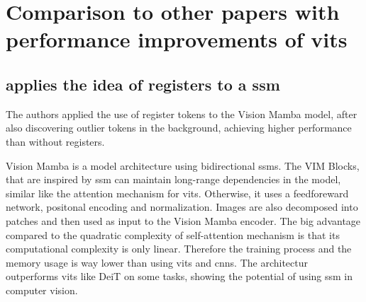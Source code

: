 \documentclass[conference]{IEEEtran}
\begin{document}


  \section{Comparison to other papers with performance improvements of \ac{vit}s}

  \subsection{\cite{mamba-needs-registers} applies the idea of registers to a \ac{ssm}}
  The authors applied the use of register tokens to the Vision Mamba model, after also discovering outlier tokens in the background, achieving higher performance than without registers. 
  
  Vision Mamba \cite{vision-mamba} is a model architecture using bidirectional \acfp{ssm}. The VIM Blocks, that are inspired by \ac{ssm} can maintain long-range dependencies in the model, similar like the attention mechanism for \acp{vit}. Otherwise, it uses a feedforeward network, positonal encoding and normalization. Images are also decomposed into patches and then used as input to the Vision Mamba encoder. The big advantage compared to the quadratic complexity of self-attention mechanism is that its computational complexity is only linear. Therefore the training process and the memory usage is way lower than using \acp{vit} and \acp{cnn}. The architectur outperforms \acp{vit} like DeiT \cite{deit} on some tasks, showing the potential of using \ac{ssm} in computer vision. \cite{vision-mamba} \cite{mamba-needs-registers}
  
\end{document}
